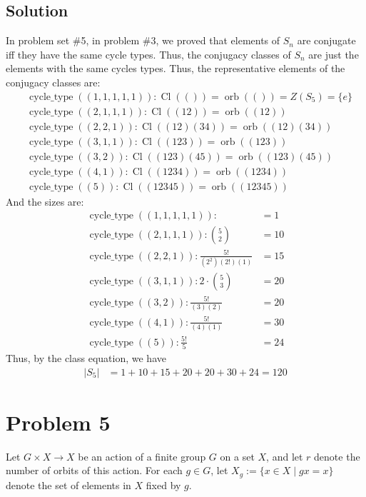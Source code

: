 \documentclass[fleqn]{article}
\DeclareMathOperator{\orb}{orb}
\DeclareMathOperator{\Cl}{Cl}
\DeclareMathOperator{\cycletype}{cycle\_type}
\begin{document}
        \subsection{Solution}
        In problem set \#5, in problem \#3, we proved that elements of $S_n$ are conjugate iff they have the same cycle types.  Thus, the conjugacy classes of $S_n$ are just the elements with the same cycles types.
        Thus, the representative elements of the conjugacy classes are:
        \begin{align}
            &\cycletype((1, 1, 1, 1, 1)): \Cl(())        = \orb(()) = Z(S_5) = \{e\} \\
            &\cycletype((2, 1, 1, 1))   : \Cl((12))      = \orb((12)) \\
            &\cycletype((2, 2, 1))      : \Cl((12)(34))  = \orb((12)(34)) \\
            &\cycletype((3, 1, 1))      : \Cl((123))     = \orb((123)) \\
            &\cycletype((3, 2))         : \Cl((123)(45)) = \orb((123)(45)) \\
            &\cycletype((4, 1))         : \Cl((1234))    = \orb((1234)) \\
            &\cycletype((5))            : \Cl((12345))   = \orb((12345))
        \end{align}
        And the sizes are:
        \begin{align}
            \cycletype((1, 1, 1, 1, 1)): &= 1  \\
            \cycletype((2, 1, 1, 1))   : \binom{5}{2} &= 10 \\
            \cycletype((2, 2, 1))      : \frac{5!}{(2^2)(2!)(1)} &= 15 \\
            \cycletype((3, 1, 1))      : 2 \cdot \binom{5}{3} &= 20 \\
            \cycletype((3, 2))         : \frac{5!}{(3)(2)} &= 20 \\
            \cycletype((4, 1))         : \frac{5!}{(4)(1)} &= 30 \\
            \cycletype((5))            : \frac{5!}{5} &= 24
        \end{align}
        Thus, by the class equation, we have
        \begin{align}
            |S_5| &= 1 + 10 + 15 + 20 + 20 + 30 + 24 = 120
        \end{align}
    
    \pagebreak
    
    \section{Problem 5}
    Let $G \times X \to X$ be an action of a finite group $G$ on a set $X$, and let $r$ denote the number of orbits of this action.  For each $g \in G$, let $X_g := \{x \in X \mid gx = x\}$ denote the set of elements in $X$ fixed by $g$.
        
\end{document}
